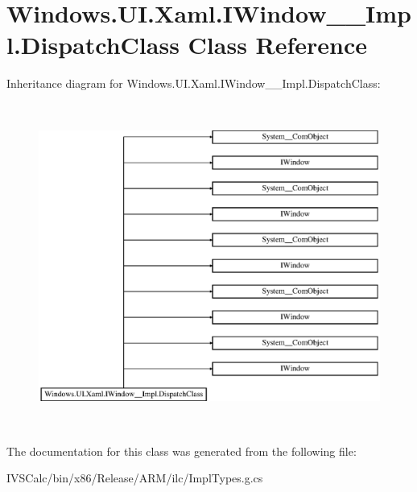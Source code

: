\hypertarget{class_windows_1_1_u_i_1_1_xaml_1_1_i_window_____impl_1_1_dispatch_class}{}\section{Windows.\+U\+I.\+Xaml.\+I\+Window\+\_\+\+\_\+\+Impl.\+Dispatch\+Class Class Reference}
\label{class_windows_1_1_u_i_1_1_xaml_1_1_i_window_____impl_1_1_dispatch_class}
Inheritance diagram for Windows.\+U\+I.\+Xaml.\+I\+Window\+\_\+\+\_\+\+Impl.\+Dispatch\+Class\+:\begin{figure}[H]
\begin{center}
\leavevmode
\includegraphics[height=10.694445cm]{class_windows_1_1_u_i_1_1_xaml_1_1_i_window_____impl_1_1_dispatch_class}
\end{center}
\end{figure}


The documentation for this class was generated from the following file\+:\begin{DoxyCompactItemize}
\item 
I\+V\+S\+Calc/bin/x86/\+Release/\+A\+R\+M/ilc/Impl\+Types.\+g.\+cs\end{DoxyCompactItemize}
